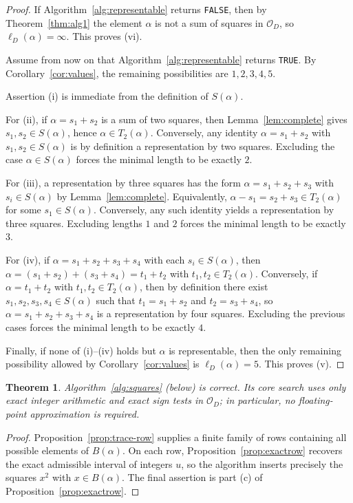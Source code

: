 \documentclass[manuscript,screen]{acmart}
\theoremstyle{plain}
\newtheorem{theorem}{Theorem}[section]
\theoremstyle{definition}
\theoremstyle{nonitalicremark}
\newcommand{\OD}{\mathcal{O}_D}
\newcommand{\len}{\ell}
\begin{document}
\begin{proof}
If Algorithm~\ref{alg:representable} returns \texttt{FALSE}, then by
Theorem~\ref{thm:alg1} the element $\alpha$ is not a sum of squares in $\OD$, so
$\len_D(\alpha)=\infty$. This proves \textup{(vi)}.

Assume from now on that Algorithm~\ref{alg:representable} returns \texttt{TRUE}. By
Corollary~\ref{cor:values}, the remaining possibilities are $1,2,3,4,5$.

Assertion \textup{(i)} is immediate from the definition of $S(\alpha)$.

For \textup{(ii)}, if $\alpha=s_1+s_2$ is a sum of two squares, then
Lemma~\ref{lem:complete} gives $s_1,s_2\in S(\alpha)$, hence
$\alpha\in T_2(\alpha)$. Conversely, any identity
$\alpha=s_1+s_2$ with $s_1,s_2\in S(\alpha)$ is by definition a representation by two squares.
Excluding the case $\alpha\in S(\alpha)$ forces the minimal length to be exactly $2$.

For \textup{(iii)}, a representation by three squares has the form
$\alpha=s_1+s_2+s_3$ with $s_i\in S(\alpha)$ by Lemma~\ref{lem:complete}. Equivalently,
$\alpha-s_1=s_2+s_3\in T_2(\alpha)$ for some $s_1\in S(\alpha)$. Conversely, any such
identity yields a representation by three squares. Excluding lengths $1$ and $2$ forces the
minimal length to be exactly $3$.

For \textup{(iv)}, if
$\alpha=s_1+s_2+s_3+s_4$ with each $s_i\in S(\alpha)$, then
\(
\alpha=(s_1+s_2)+(s_3+s_4)=t_1+t_2
\)
with $t_1,t_2\in T_2(\alpha)$. Conversely, if
$\alpha=t_1+t_2$ with $t_1,t_2\in T_2(\alpha)$, then by definition there exist
$s_1,s_2,s_3,s_4\in S(\alpha)$ such that
$t_1=s_1+s_2$ and $t_2=s_3+s_4$, so
$\alpha=s_1+s_2+s_3+s_4$ is a representation by four squares.
Excluding the previous cases forces the minimal length to be exactly $4$.

Finally, if none of \textup{(i)}--\textup{(iv)} holds but $\alpha$ is representable, then the only
remaining possibility allowed by Corollary~\ref{cor:values} is $\len_D(\alpha)=5$.
This proves \textup{(v)}.
\end{proof}
%
\begin{theorem}\label{thm:squares}
Algorithm~\ref{alg:squares} (below) is correct. Its core search uses only exact integer arithmetic and
exact sign tests in $\OD$; in particular, no floating-point approximation is required.
\end{theorem}
%
\begin{proof}
Proposition~\ref{prop:trace-row} supplies a finite family of rows containing all possible elements
of $B(\alpha)$. On each row, Proposition~\ref{prop:exactrow} recovers the exact admissible
interval of integers $u$, so the algorithm inserts precisely the squares $x^2$ with
$x\in B(\alpha)$. The final assertion is part \textup{(c)} of
Proposition~\ref{prop:exactrow}.
\end{proof}
\end{document}
